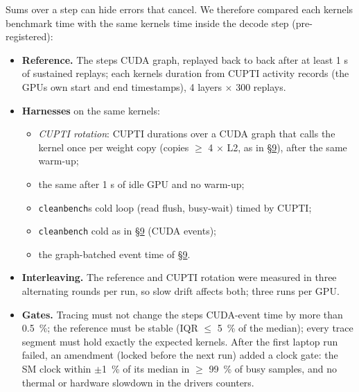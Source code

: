 \documentclass[11pt,a4paper]{article}
\providecommand{\tightlist}{\setlength{\itemsep}{0pt}\setlength{\parskip}{0pt}}
\begin{document}
Sums over a step can hide errors that cancel. We therefore compared each kernel\textquotesingle s benchmark time with the same
kernel\textquotesingle s time inside the decode step (pre-registered):

\begin{itemize}
\tightlist
\item
  \textbf{Reference.} The step\textquotesingle s CUDA graph, replayed back to back after at least 1 s of sustained replays; each kernel\textquotesingle s
  duration from CUPTI activity records (the GPU\textquotesingle s own start and end timestamps), 4 layers \ensuremath{\times} 300 replays.
\item
  \textbf{Harnesses} on the same kernels:

  \begin{itemize}
  \tightlist
  \item
    \emph{CUPTI rotation}: CUPTI durations over a CUDA graph that calls the kernel once per weight copy (copies \ensuremath{\ge} 4 \ensuremath{\times} L2,
    as in \hyperref[end-to-end-check-which-number-predicts-a-decode-step]{\S{}9}), after the same warm-up;
  \item
    the same after 1 s of idle GPU and no warm-up;
  \item
    \texttt{cleanbench}\textquotesingle s cold loop (read flush, busy-wait) timed by CUPTI;
  \item
    \texttt{cleanbench} cold as in \hyperref[end-to-end-check-which-number-predicts-a-decode-step]{\S{}9} (CUDA events);
  \item
    the graph-batched event time of \hyperref[end-to-end-check-which-number-predicts-a-decode-step]{\S{}9}.
  \end{itemize}
\item
  \textbf{Interleaving.} The reference and CUPTI rotation were measured in three alternating rounds per run, so slow
  drift affects both; three runs per GPU.
\item
  \textbf{Gates.} Tracing must not change the step\textquotesingle s CUDA-event time by more than 0.5~\%; the reference must be stable
  (IQR \ensuremath{\le} 5~\% of the median); every trace segment must hold exactly the expected kernels. After the first laptop run
  failed, an amendment (locked before the next run) added a clock gate: the SM clock within \ensuremath{\pm}1~\% of its median in
  \ensuremath{\ge} 99~\% of busy samples, and no thermal or hardware slowdown in the driver\textquotesingle s counters.
\end{itemize}
\end{document}
